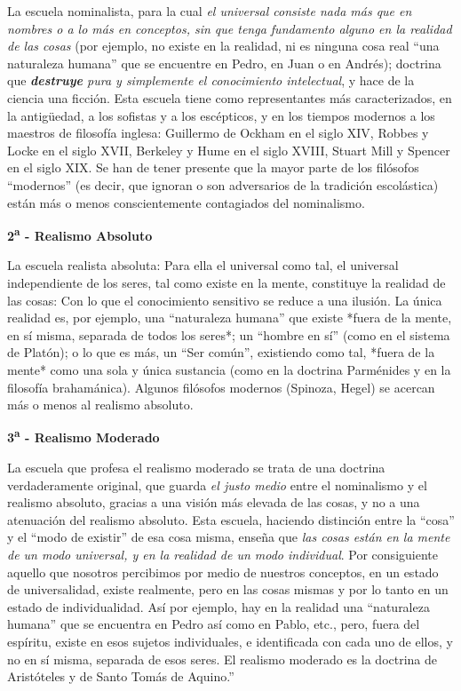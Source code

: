 \documentclass{article}
\begin{document}
    La escuela nominalista, para la cual \emph{el universal consiste nada más que en nombres o a lo más en conceptos, sin que tenga fundamento alguno en la realidad de las cosas} (por ejemplo, no existe en la realidad, ni es ninguna cosa real ``una naturaleza humana'' que se encuentre en Pedro, en Juan o en Andrés); doctrina que  \emph{\textbf{destruye} pura y simplemente el conocimiento intelectual}, y hace de la ciencia una ficción. Esta escuela tiene como representantes más caracterizados, en la antig\"uedad, a los sofistas y a los escépticos, y en los tiempos modernos a los maestros de filosofía inglesa: Guillermo de Ockham en el siglo XIV, Robbes y Locke en el siglo XVII, Berkeley y Hume en el siglo XVIII, Stuart Mill y Spencer en el siglo XIX. Se han de tener presente que la mayor parte de los filósofos ``modernos'' (es decir, que ignoran o son adversarios de la tradición escolástica) están más o menos conscientemente contagiados del nominalismo. \par 

\begin{center}
    \textbf{2\textsuperscript{a} - Realismo Absoluto}
\end{center}

   La escuela realista absoluta: Para ella el universal como tal, el universal independiente de los seres, tal como existe en la mente, constituye la realidad de las cosas: Con lo que el conocimiento sensitivo se reduce a una ilusión. La única realidad es, por ejemplo, una ``naturaleza humana'' que existe *fuera de la mente, en sí misma, separada de todos los seres*; un ``hombre en sí'' (como en el sistema de Platón); o lo que es más, un ``Ser común'', existiendo como tal, *fuera de la mente* como una sola y única sustancia (como en la doctrina Parménides y en la filosofía brahamánica). Algunos filósofos modernos (Spinoza, Hegel) se acercan más o menos al realismo absoluto. \par

\newpage

\begin{center}
    \textbf{3\textsuperscript{a} - Realismo Moderado}
\end{center}

    La escuela que profesa el realismo moderado se trata de una doctrina verdaderamente original, que guarda \emph{el justo medio} entre el nominalismo y el realismo absoluto, gracias a una visión más elevada de las cosas, y no a una atenuación del realismo absoluto. Esta escuela, haciendo distinción entre la ``cosa'' y el ``modo de existir'' de esa cosa misma, enseña que \emph{las cosas están en la mente de un modo universal, y en la realidad de un modo individual}. Por consiguiente aquello que nosotros percibimos por medio de nuestros conceptos, en un estado de universalidad, existe realmente, pero en las cosas mismas y por lo tanto en un estado de individualidad. Así por ejemplo, hay en la realidad una ``naturaleza humana'' que se encuentra en Pedro así como en Pablo, etc., pero, fuera del espíritu, existe en esos sujetos individuales, e identificada con cada uno de ellos, y no en sí misma, separada de esos seres. El realismo moderado es la doctrina de Aristóteles y de Santo Tomás de Aquino.'' \par
    
\end{document}
